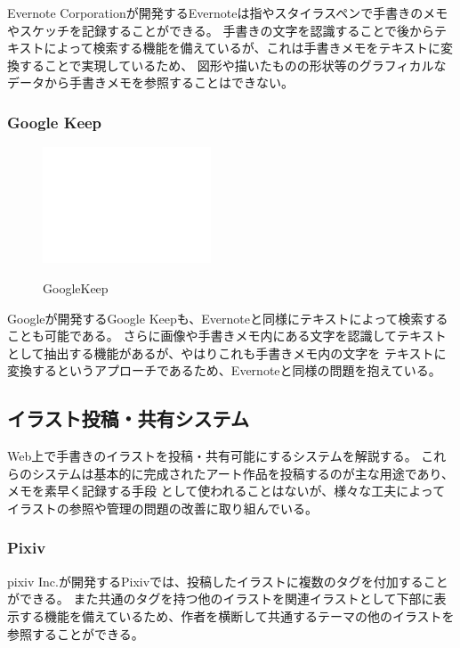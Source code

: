 Evernote Corporationが開発するEvernoteは指やスタイラスペンで手書きのメモやスケッチを記録することができる。
手書きの文字を認識することで後からテキストによって検索する機能を備えているが、これは手書きメモをテキストに変換することで実現しているため、
図形や描いたものの形状等のグラフィカルなデータから手書きメモを参照することはできない。

\subsubsection{Google Keep}

\begin{figure}[htbp]
    \begin{center}
    {\includegraphics[width=50mm]{images/testimage.png}} \end{center}
    \caption{GoogleKeep}
\end{figure}


Googleが開発するGoogle Keepも、Evernoteと同様にテキストによって検索することも可能である。
さらに画像や手書きメモ内にある文字を認識してテキストとして抽出する機能があるが、やはりこれも手書きメモ内の文字を
テキストに変換するというアプローチであるため、Evernoteと同様の問題を抱えている。

\subsection{イラスト投稿・共有システム}
Web上で手書きのイラストを投稿・共有可能にするシステムを解説する。
これらのシステムは基本的に完成されたアート作品を投稿するのが主な用途であり、メモを素早く記録する手段
として使われることはないが、様々な工夫によってイラストの参照や管理の問題の改善に取り組んでいる。

\subsubsection{Pixiv}

pixiv Inc.が開発するPixivでは、投稿したイラストに複数のタグを付加することができる。
また共通のタグを持つ他のイラストを関連イラストとして下部に表示する機能を備えているため、作者を横断して共通するテーマの他のイラストを参照することができる。

